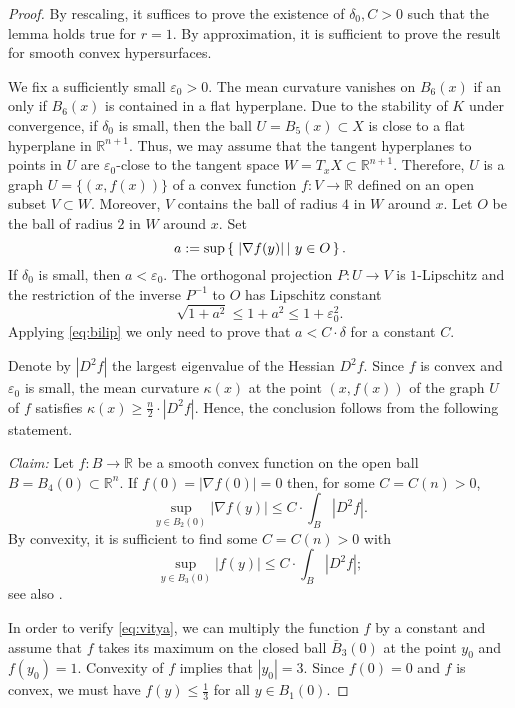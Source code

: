 \documentclass[12pt,leqno,intlimits]{amsart}
\numberwithin{equation}{section}
\theoremstyle{definition}
\theoremstyle{remark}
\newcommand{\R}{\mathbb{R}}
\def\:{\colon}
\newcommand*{\set}[2]{\left\{\,\left.{#1}\vphantom{#2}\,\right|\,{#2}\,\right\}}
\begin{document}
\begin{proof}
By rescaling, it suffices to prove the existence of $\delta _0, C>0$ such that the lemma holds true for $r=1$.
By approximation, it is sufficient to prove the result for smooth convex hypersurfaces.

We fix a sufficiently small $\varepsilon _0>0$. The mean curvature vanishes on $B_6 (x)$ if an only if $B_6(x)$ is contained in a flat hyperplane.
Due to the stability of $K$ under convergence, if $\delta_0$ is small, then
the ball $U=B_{5} (x) \subset X$ is close to a flat hyperplane in $\R^{n+1}$.
Thus, we may assume that the tangent hyperplanes to points in $U$ are $\varepsilon_0$-close to the tangent
space $W =T_xX \subset \R^{n+1}$. Therefore, $U$ is a graph $U=\{(x,f(x))\}$ of a convex function $f\:V\to \R$ defined on an open subset $V\subset W$. Moreover, $V$ contains the ball of radius $4$ in $W$ around $x$. Let $O$
be the ball of radius $2$ in $W$ around $x$. 
Set
$$a :=\sup \set{|\nabla f (y)|}{y\in O}.$$
If $\delta _0$ is small, then $a<\varepsilon_0$.
The orthogonal projection $P\:U\to V$ is $1$-Lipschitz and the restriction of the inverse $P^{-1}$ to $O$ has Lipschitz constant $$\sqrt {1+ a^2} \leq 1+a^2 \leq 1+\varepsilon_0 ^2.$$
Applying \eqref{eq:bilip} we only need to prove that $a < C \cdot \delta $ for a constant $C$.

Denote by $|D^2f|$ the largest eigenvalue of the Hessian $D^2f$.
Since $f$ is convex and $\varepsilon _0$ is small, the mean curvature $\mathcal \kappa (x)$ at the point $(x,f(x))$ of the graph $U$ of $f$ satisfies $\kappa (x) \geq \frac n 2 \cdot |D^2 f|$. Hence, the conclusion follows from the following statement.

\emph{Claim:} Let $f:B \to \R$ be a smooth convex function on the open ball $B=B_4 (0)\subset \R^n$.
If $f(0)=|\nabla f(0)| =0$ then, for some $C=C(n)>0$,
$$\sup_{y\in B_2 (0)} |\nabla f (y)| \leq C\cdot \int _{B} |D^2f|.$$
By convexity, it is sufficient to find some $C=C(n)>0$ with
\begin{equation} \label{eq:vitya}
\sup _{y\in B_3 (0) }| f(y)| \leq C \cdot \int _{B} |D^2f|;
\end{equation}
see also \cite[Theorem 6.7]{Evans}.

In order to verify \eqref{eq:vitya}, we can multiply the function $f$ by a constant and assume that
$f$ takes its maximum on the closed ball $\bar B_3 (0)$ at the point $y_0$ and $f(y_0)=1$.
Convexity of $f$ implies that $|y_0|=3$.
Since $f(0)=0$ and $f$ is convex, we must have $f(y)\leq \frac 1 3$ for all $y\in B_1(0)$.


\end{proof}
\end{document}
